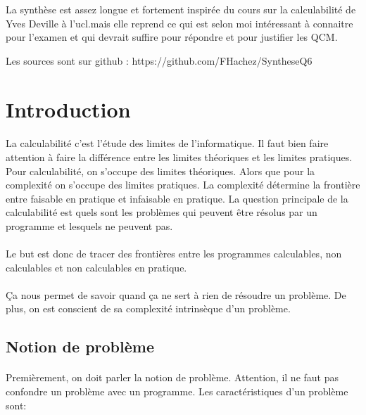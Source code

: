 \tableofcontents
\newpage

La synthèse est assez longue et fortement inspirée du cours sur la calculabilité
de Yves Deville à l'ucl.mais elle reprend ce qui est selon moi intéressant à connaitre
pour l'examen et qui devrait suffire pour répondre et pour justifier les QCM.

Les sources sont sur github : https://github.com/FHachez/SyntheseQ6

\section{Introduction}
\label{sec:introduction}

\paragraph{}
La calculabilité c'est l'étude des limites de l'informatique. Il faut bien 
faire attention à faire la différence entre les limites théoriques et les limites
pratiques. Pour calculabilité, on s'occupe des limites théoriques.
Alors que pour la complexité on s'occupe des limites pratiques. La complexité
détermine la frontière entre faisable en pratique et infaisable en pratique.
La question principale de la calculabilité est quels sont les problèmes qui peuvent
être résolus par un programme et lesquels ne peuvent pas.

\paragraph{} Le but est donc de tracer des frontières entre les programmes calculables,
non calculables et non calculables en pratique.

\paragraph{}
Ça nous permet de savoir quand ça ne sert à rien de résoudre un problème.
De plus, on est conscient de sa complexité intrinsèque d'un
problème.

\subsection{Notion de problème}
\label{subsec:notion_de_probl_me}

\paragraph{}
Premièrement, on doit parler la notion de problème.
Attention, il ne faut pas confondre un problème avec un programme.
Les caractéristiques d'un problème sont:

